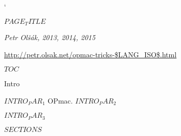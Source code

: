 
\activettchar `

\tit $PAGE_TITLE$

\centerline{\it Petr Olšák, 2013, 2014, 2015}

\bigskip
\centerline{\url{http://petr.olsak.net/opmac-tricks-$LANG_ISO$.html}}

\notoc\nonum
\sec $TOC$

\maketoc


\nonum \sec Intro

$INTRO_PAR_1$ OPmac. $INTRO_PAR_2$

$INTRO_PAR_3$


$SECTIONS$

\bye
